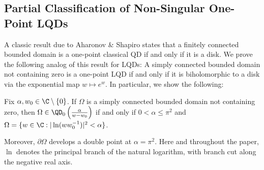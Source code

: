 \documentclass{article}
\numberwithin{equation}{section}
\begin{document}
\subsection{Partial Classification of Non-Singular One-Point LQDs}\label{subsec:BasicOnePTLQDEx}
A classic result due to Aharonov \& Shapiro \cite{AharonovShapiro} states that a finitely connected bounded domain is a one-point classical QD if and only if it is a disk. We prove the following analog of this result for LQDs: A simply connected bounded domain not containing zero is a one-point LQD if and only if it is biholomorphic to a disk via the exponential map $w\mapsto e^{w}$. In particular, we show the following:
\begin{theorem}\label{thm:NZOnePtLQD}
Fix $\alpha,w_0\in\C\setminus\{0\}$. If $\Omega$ is a simply connected bounded domain not containing zero, then $\Omega\in\QD_0\left(\frac{\alpha}{w-w_0}\right)$ if and only if $0<\alpha\leq\pi^2$ and $\Omega=\{w\in\C:|\ln(ww_0^{-1})|^2<\alpha\}$.
\end{theorem}
Moreover, $\partial\Omega$ develops a double point at $\alpha=\pi^2$. Here and throughout the paper, $\ln$ denotes the principal branch of the natural logarithm, with branch cut along the negative real axis.
\end{document}
